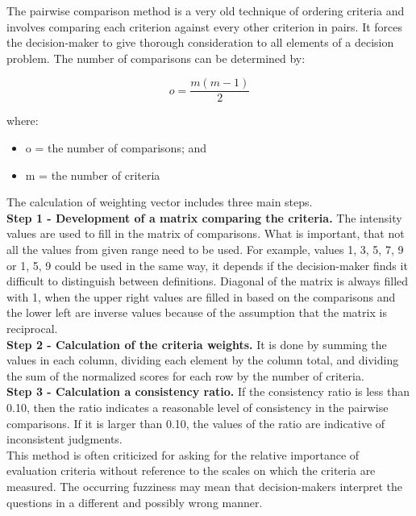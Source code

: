 The pairwise comparison method is a very old technique of ordering criteria and involves comparing each criterion against every other criterion in pairs. It forces the decision-maker to give thorough consideration to all elements of a decision problem. The number of comparisons can be determined by:

\begin{equation}
    o = \frac{m(m-1)}{2}
\end{equation}

where:
\begin{itemize}
    \item o = the number of comparisons; and
    \item m = the number of criteria
\end{itemize}

The calculation of weighting vector includes three main steps. \\

\textbf{Step 1 -  Development of a matrix comparing the criteria.} The intensity values are used to fill in the matrix of comparisons. What is important, that not all the values from given range need to be used. For example, values 1, 3, 5, 7, 9 or 1, 5, 9 could be used in the same way, it depends if the decision-maker finds it difficult to distinguish between definitions. Diagonal of the matrix is always filled with 1, when the upper right values are filled in based on the comparisons and the lower left are inverse values because of the assumption that the matrix is reciprocal. \\

\textbf{Step 2 - Calculation of the criteria weights.} It is done by summing the values in each column, dividing each element by the column total, and dividing the sum of the normalized scores for each row by the number of criteria. \\

\textbf{Step 3 - Calculation a consistency ratio.} If the consistency ratio is less than 0.10, then the ratio indicates a reasonable level of consistency in the pairwise comparisons. If it is larger than 0.10, the values of the ratio are indicative of inconsistent judgments. \\

This method is often criticized for asking for the relative importance of evaluation criteria without reference to the scales on which the criteria are measured. The occurring fuzziness may mean that decision-makers interpret the questions in a different and possibly wrong manner.
